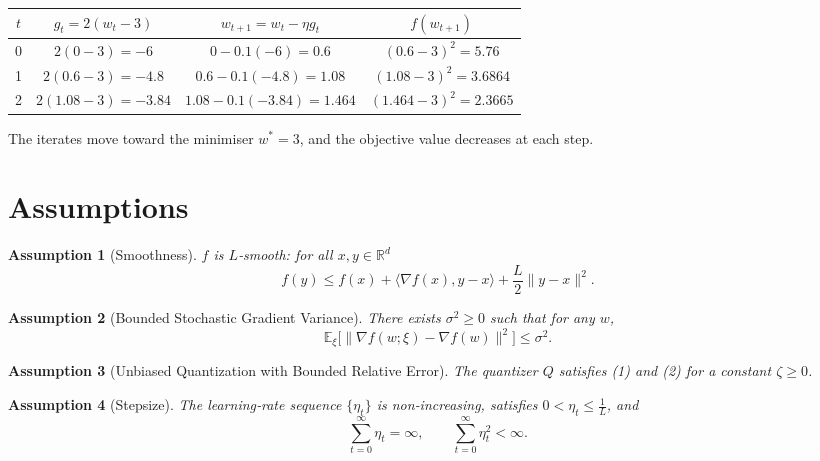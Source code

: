 \documentclass{article}
\newtheorem{assumption}{Assumption}
\begin{document}
\begin{center}
\begin{tabular}{c|c|c|c}
$t$ & $g_{t}=2(w_{t}-3)$ & $w_{t+1}=w_{t}-\eta g_{t}$ & $f(w_{t+1})$\\\hline
0 & $2(0-3)=-6$ & $0-0.1(-6)=0.6$ & $(0.6-3)^{2}=5.76$\\
1 & $2(0.6-3)=-4.8$ & $0.6-0.1(-4.8)=1.08$ & $(1.08-3)^{2}=3.6864$\\
2 & $2(1.08-3)=-3.84$ & $1.08-0.1(-3.84)=1.464$ & $(1.464-3)^{2}=2.3665$\\
\end{tabular}
\end{center}
The iterates move toward the minimiser $w^{*}=3$, and the objective value decreases at each step.

\newpage
\section*{Assumptions}
\begin{assumption}[Smoothness]\label{ass:smooth}
$f$ is $L$‑smooth: for all $x,y\in\mathbb{R}^{d}$
\[
f(y)\le f(x)+\langle \nabla f(x),y-x\rangle+\frac{L}{2}\|y-x\|^{2}.
\]
\end{assumption}

\begin{assumption}[Bounded Stochastic Gradient Variance]\label{ass:variance}
There exists $\sigma^{2}\ge0$ such that for any $w$,
\[
\mathbb{E}_{\xi}\!\big[\| \nabla f(w;\xi)-\nabla f(w)\|^{2}\big]\le\sigma^{2}.
\]
\end{assumption}

\begin{assumption}[Unbiased Quantization with Bounded Relative Error]\label{ass:quant}
The quantizer $Q$ satisfies (1) and (2) for a constant $\zeta\ge0$.
\end{assumption}

\begin{assumption}[Stepsize]\label{ass:stepsize}
The learning‑rate sequence $\{\eta_{t}\}$ is non‑increasing, satisfies $0<\eta_{t}\le \frac{1}{L}$, and
\[
\sum_{t=0}^{\infty}\eta_{t}= \infty,\qquad \sum_{t=0}^{\infty}\eta_{t}^{2}<\infty .
\]
\end{assumption}
\end{document}
